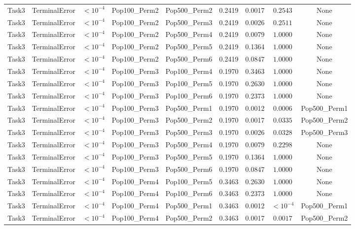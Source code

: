 \documentclass[8pt]{article}
\begin{document}
\begin{longtable}{llccccccc}
Task3 & TerminalError & $< 10^{-4}$ & Pop100\_Perm2 & Pop500\_Perm2 & 0.2419 & 0.0017 & $0.2543$ & None \\
Task3 & TerminalError & $< 10^{-4}$ & Pop100\_Perm2 & Pop500\_Perm3 & 0.2419 & 0.0026 & $0.2511$ & None \\
Task3 & TerminalError & $< 10^{-4}$ & Pop100\_Perm2 & Pop500\_Perm4 & 0.2419 & 0.0079 & $1.0000$ & None \\
Task3 & TerminalError & $< 10^{-4}$ & Pop100\_Perm2 & Pop500\_Perm5 & 0.2419 & 0.1364 & $1.0000$ & None \\
Task3 & TerminalError & $< 10^{-4}$ & Pop100\_Perm2 & Pop500\_Perm6 & 0.2419 & 0.0847 & $1.0000$ & None \\
Task3 & TerminalError & $< 10^{-4}$ & Pop100\_Perm3 & Pop100\_Perm4 & 0.1970 & 0.3463 & $1.0000$ & None \\
Task3 & TerminalError & $< 10^{-4}$ & Pop100\_Perm3 & Pop100\_Perm5 & 0.1970 & 0.2630 & $1.0000$ & None \\
Task3 & TerminalError & $< 10^{-4}$ & Pop100\_Perm3 & Pop100\_Perm6 & 0.1970 & 0.2373 & $1.0000$ & None \\
Task3 & TerminalError & $< 10^{-4}$ & Pop100\_Perm3 & Pop500\_Perm1 & 0.1970 & 0.0012 & $0.0006$ & Pop500\_Perm1 \\
Task3 & TerminalError & $< 10^{-4}$ & Pop100\_Perm3 & Pop500\_Perm2 & 0.1970 & 0.0017 & $0.0335$ & Pop500\_Perm2 \\
Task3 & TerminalError & $< 10^{-4}$ & Pop100\_Perm3 & Pop500\_Perm3 & 0.1970 & 0.0026 & $0.0328$ & Pop500\_Perm3 \\
Task3 & TerminalError & $< 10^{-4}$ & Pop100\_Perm3 & Pop500\_Perm4 & 0.1970 & 0.0079 & $0.2298$ & None \\
Task3 & TerminalError & $< 10^{-4}$ & Pop100\_Perm3 & Pop500\_Perm5 & 0.1970 & 0.1364 & $1.0000$ & None \\
Task3 & TerminalError & $< 10^{-4}$ & Pop100\_Perm3 & Pop500\_Perm6 & 0.1970 & 0.0847 & $1.0000$ & None \\
Task3 & TerminalError & $< 10^{-4}$ & Pop100\_Perm4 & Pop100\_Perm5 & 0.3463 & 0.2630 & $1.0000$ & None \\
Task3 & TerminalError & $< 10^{-4}$ & Pop100\_Perm4 & Pop100\_Perm6 & 0.3463 & 0.2373 & $1.0000$ & None \\
Task3 & TerminalError & $< 10^{-4}$ & Pop100\_Perm4 & Pop500\_Perm1 & 0.3463 & 0.0012 & $< 10^{-4}$ & Pop500\_Perm1 \\
Task3 & TerminalError & $< 10^{-4}$ & Pop100\_Perm4 & Pop500\_Perm2 & 0.3463 & 0.0017 & $0.0017$ & Pop500\_Perm2 \\

\end{longtable}
\end{document}
